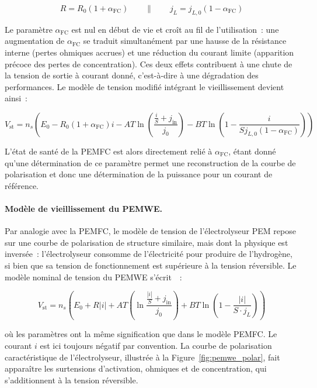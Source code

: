 \begin{equation}
    R = R_0 (1 + \alpha_{\text{FC}}) \qquad \| \qquad j_L = j_{L,0}(1 - \alpha_{\text{FC}})
    \label{eq:pemfc_aging_params}
\end{equation}

Le paramètre $\alpha_{\text{FC}}$ est nul en début de vie et croît au fil de l'utilisation~: une augmentation de $\alpha_{\text{FC}}$ se traduit simultanément par une hausse de la résistance interne (pertes ohmiques accrues) et une réduction du courant limite (apparition précoce des pertes de concentration). Ces deux effets contribuent à une chute de la tension de sortie à courant donné, c'est-à-dire à une dégradation des performances. Le modèle de tension modifié intégrant le vieillissement devient ainsi~:

\begin{equation}
    V_{\text{st}} = n_s \left( E_0 - R_0(1+\alpha_{\text{FC}})i - AT\ln\left( \frac{\frac{i}{S} + j_{\text{in}}}{j_0}\right) - BT\ln\left(1 - \frac{i}{Sj_{L,0}(1-\alpha_{\text{FC}})}\right) \right)
    \label{eq:pemfc_voltage_aging}
\end{equation}

L'état de santé de la PEMFC est alors directement relié à $\alpha_{\text{FC}}$, étant donné qu'une détermination de ce paramètre permet une reconstruction de la courbe de polarisation et donc une détermination de la puissance pour un courant de référence.

\paragraph{Modèle de vieillissement du PEMWE.}

Par analogie avec la PEMFC, le modèle de tension de l'électrolyseur PEM repose sur une courbe de polarisation de structure similaire, mais dont la physique est inversée~: l'électrolyseur consomme de l'électricité pour produire de l'hydrogène, si bien que sa tension de fonctionnement est supérieure à la tension réversible. Le modèle nominal de tension du PEMWE s'écrit~\cite{abdin_modelling_2015}~:

\begin{equation}
    V_{\text{st}} = n_s \left( E_0 + R|i| + AT\left(\ln\frac{\frac{|i|}{S} + j_{\text{in}}}{j_0}\right) + BT\ln\left(1 - \frac{|i|}{S \cdot j_L}\right) \right)
    \label{eq:pemwe_voltage_nominal}
\end{equation}

où les paramètres ont la même signification que dans le modèle PEMFC. Le courant $i$ est ici toujours négatif par convention. La courbe de polarisation caractéristique de l'électrolyseur, illustrée à la Figure~\ref{fig:pemwe_polar}, fait apparaître les surtensions d'activation, ohmiques et de concentration, qui s'additionnent à la tension réversible.

